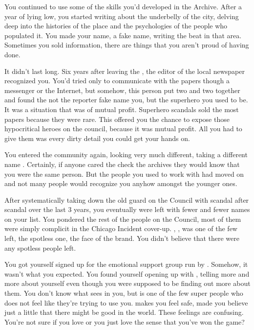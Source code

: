 \documentclass[char]{LRSguildcamp1}
\begin{document}
You continued to use some of the skills you'd developed in the Archive. After a year of lying low, you started writing about the underbelly of the city, delving deep into the histories of the place and the psychologies of the people who populated it. You made your name, a fake name, writing the beat in that area. Sometimes you sold information, there are things that you aren't proud of having done. 

It didn't last long.  Six years after leaving the \cHeroLeague{}, the editor of the local newspaper recognized you. You'd tried only to communicate with the papers though a messenger or the Internet, but somehow, this person put two and two together and found the not the reporter fake name you, but the superhero you used to be. It was a situation that was of mutual profit. Superhero scandals sold the most papers because they were rare. This offered you the chance to expose those hypocritical heroes on the council, because it was mutual profit. All you had to give them was every dirty detail you could get your hands on. 

You entered the community again, looking very much different, taking a different name \cYS{\MYsupername}. Certainly, if anyone cared the check the archives they would know that you were the same person. But the people you used to work with had moved on and not many people would recognize you anyhow amongst the younger ones.  

After systematically taking down the old guard on the Council with scandal after scandal over the last 3 years, you eventually were left with fewer and fewer names on your list. You pondered the rest of the people on the Council, most of them were simply complicit in the Chicago Incident cover-up. \cYoungest{\MYsupername}, \cYoungest{}, was one of the few left, the spotless one, the face of the brand. You didn't believe that there were any spotless people left. 
 
You got yourself signed up for the emotional support group run by \cYoungest{\them}. Somehow, it wasn't what you expected. You found yourself opening up with \cYoungest{\them}, telling \cYoungest{\them} more and more about yourself even though you were supposed to be finding out more about them. You don't know what \cYoungest{\they} sees in you, but \cYoungest{\they} is one of the few super people who does not feel like they're trying to use you. \cYoungest{\intro} makes you feel safe, made you believe just a little that there might be good in the world. These feelings are confusing. You're not sure if you love \cYoungest{\intro} or you just love the sense that you've won the game?
\end{document}
